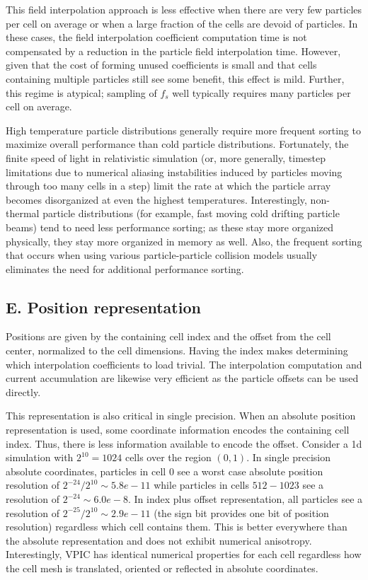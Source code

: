 \documentclass[aps,prl,preprint,preprintnumbers,groupedaddress]{revtex4}
\begin{document}
This field interpolation approach is less effective when there are
very few particles per cell on average or when a large fraction of the
cells are devoid of particles.  In these cases, the field
interpolation coefficient computation time is not compensated by a
reduction in the particle field interpolation time.  However, given
that the cost of forming unused coefficients is small and that cells
containing multiple particles still see some benefit, this effect is
mild.  Further, this regime is atypical; sampling of $f_s$ well
typically requires many particles per cell on average.

High temperature particle distributions generally require more
frequent sorting to maximize overall performance than cold particle
distributions.  Fortunately, the finite speed of light in relativistic
simulation (or, more generally, timestep limitations due to numerical
aliasing instabilities induced by particles moving through too many
cells in a step) limit the rate at which the particle array becomes
disorganized at even the highest temperatures.  Interestingly,
non-thermal particle distributions (for example, fast moving cold
drifting particle beams) tend to need less performance sorting; as
these stay more organized physically, they stay more organized in
memory as well.  Also, the frequent sorting that occurs when using
various particle-particle collision models usually eliminates the need
for additional performance sorting.

\subsection{E. Position representation}

Positions are given by the containing cell index and the offset from
the cell center, normalized to the cell dimensions.  Having the index
makes determining which interpolation coefficients to load trivial.
The interpolation computation and current accumulation are likewise
very efficient as the particle offsets can be used directly.

This representation is also critical in single precision.  When an
absolute position representation is used, some coordinate information
encodes the containing cell index.  Thus, there is less information
available to encode the offset.  Consider a 1d simulation with $2^{10}
= 1024$ cells over the region $(0,1)$.  In single precision absolute
coordinates, particles in cell $0$ see a worst case absolute position
resolution of $2^{-24}/2^{10} \sim 5.8e-11$ while particles in cells
$512-1023$ see a resolution of $2^{-24} \sim 6.0e-8$.  In index plus
offset representation, all particles see a resolution of
$2^{-25}/2^{10} \sim 2.9e-11$ (the sign bit provides one bit of
position resolution) regardless which cell contains them.  This is
better everywhere than the absolute representation and does not
exhibit numerical anisotropy.  Interestingly, VPIC has identical
numerical properties for each cell regardless how the cell mesh is
translated, oriented or reflected in absolute coordinates.
\end{document}
